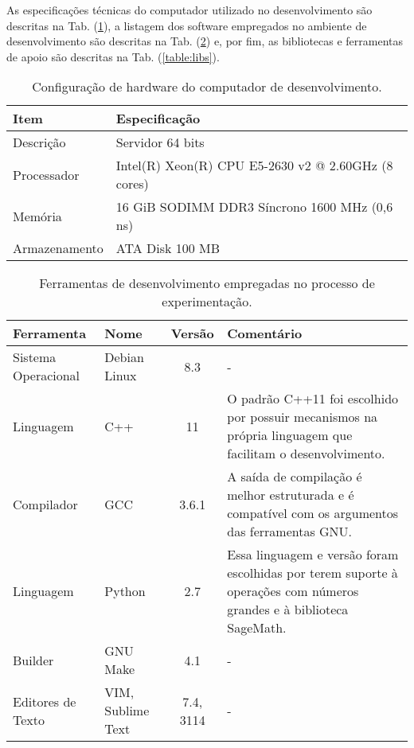 As especificações técnicas do computador utilizado no desenvolvimento são descritas na Tab. (\ref{table:config}), a listagem dos software empregados no ambiente de desenvolvimento são descritas na Tab. (\ref{table:tools}) e, por fim, as bibliotecas e ferramentas de apoio são descritas na Tab. (\ref{table:libs}).

\begin{table}[!ht]
\centering
\caption{Configuração de hardware do computador de desenvolvimento.}
\begin{tabular}{ll}
\toprule
\textbf{Item}        & \textbf{Especificação}                               \\ \midrule
Descrição            & Servidor 64 bits                                     \\
\rowcolor[gray]{0.9}
Processador          & Intel(R) Xeon(R) CPU E5-2630 v2 @ 2.60GHz (8 cores)  \\
Memória              & 16 GiB SODIMM DDR3 Síncrono 1600 MHz (0,6 ns)        \\
\rowcolor[gray]{0.9}
Armazenamento        & ATA Disk 100 MB                                      \\
\bottomrule
\end{tabular}
\label{table:config}
\end{table}

%
%
\begin{table}[!ht]
\centering
\caption{Ferramentas de desenvolvimento empregadas no processo de experimentação.}
    \begin{tabularx}{0.95\textwidth}{llcX}
    \toprule
        \textbf{Ferramenta} & {\textbf{Nome}} & \textbf{Versão} & \textbf{Comentário}  \\
    \midrule
        Sistema Operacional  & Debian Linux      & 8.3       & -                                                            \\
        \rowcolor[gray]{0.9}
        Linguagem            & C++               & 11        & O padrão C++11 foi escolhido por possuir mecanismos na própria linguagem que facilitam o desenvolvimento. \\
        Compilador           & GCC               & 3.6.1     & A saída de compilação é melhor estruturada e é compatível com os argumentos das ferramentas GNU.          \\
        \rowcolor[gray]{0.9}
        Linguagem            & Python            & 2.7       & Essa linguagem e versão foram escolhidas por terem suporte à operações com números grandes e à biblioteca SageMath. \\
        Builder              & GNU Make          & 4.1       & -                                                                                                         \\
        \rowcolor[gray]{0.9}
        Editores de Texto    & VIM, Sublime Text & 7.4, 3114 & -                                                            \\
    \bottomrule

    \end{tabularx}
\label{table:tools}

\end{table}

